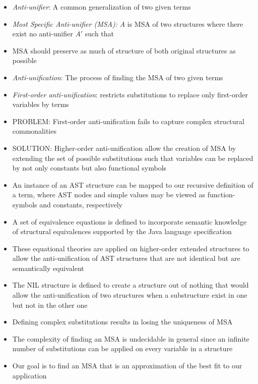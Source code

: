 \documentclass{article}
\newcommand{\itt}{\textit}
\newcommand{\tsc}{\textsc}
\newcommand{\vars}{\textit}
\begin{document}
\begin{itemize} [leftmargin=.1in]
\item \itt{Anti-unifier}: A common generalization of two given terms
\item \itt{Most Specific Anti-unifier (MSA):} \vars{A} is MSA of two structures where there exist no anti-unifier \vars{A}${\prime}$ such that
\item MSA should preserve as much of structure of both original structures as possible
\item \itt{Anti-unification}: The process of finding the MSA of two given terms
\item \itt{First-order anti-unification}: restricts substitutions to replace only first-order variables by terms

\item \tsc{PROBLEM:} First-order anti-unification fails to capture complex structural commonalities
\item \tsc{SOLUTION:} Higher-order anti-unification allow the creation of MSA by extending the set of possible substitutions such that variables can be replaced by not only constants but also functional symbols

\item An instance of an AST structure can be mapped  to our recursive definition of a term, where AST nodes and simple values may be viewed as function-symbols and constants, respectively

\item A set of equivalence equations is defined to incorporate semantic knowledge of structural equivalences supported by the Java language specification
\item These equational theories are applied on higher-order extended structures to allow the anti-unification of AST structures that are not identical but are semantically equivalent

\item The NIL structure is defined to create a structure out of nothing that would allow the anti-unification of two structures when a substructure exist in one but not in the other one

\item Defining complex substitutions results in losing the uniqueness of MSA
\item The complexity of finding an MSA is undecidable in general since an infinite number of substitutions can be applied on every variable in a structure
\item Our goal is to find an MSA that is an approximation of the best fit to our application


\end{itemize}
\end{document}
